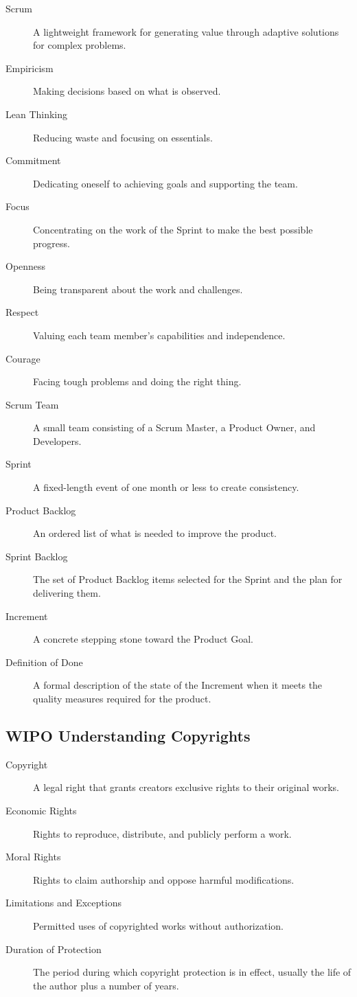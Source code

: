 \documentclass{article}
\begin{document}
\begin{description}
  \item[Scrum] A lightweight framework for generating value through adaptive solutions for complex problems.
  \item[Empiricism] Making decisions based on what is observed.
  \item[Lean Thinking] Reducing waste and focusing on essentials.
  \item[Commitment] Dedicating oneself to achieving goals and supporting the team.
  \item[Focus] Concentrating on the work of the Sprint to make the best possible progress.
  \item[Openness] Being transparent about the work and challenges.
  \item[Respect] Valuing each team member's capabilities and independence.
  \item[Courage] Facing tough problems and doing the right thing.
  \item[Scrum Team] A small team consisting of a Scrum Master, a Product Owner, and Developers.
  \item[Sprint] A fixed-length event of one month or less to create consistency.
  \item[Product Backlog] An ordered list of what is needed to improve the product.
  \item[Sprint Backlog] The set of Product Backlog items selected for the Sprint and the plan for delivering them.
  \item[Increment] A concrete stepping stone toward the Product Goal.
  \item[Definition of Done] A formal description of the state of the Increment when it meets the quality measures required for the product.
\end{description}


\subsection{WIPO Understanding Copyrights}

\begin{description}
  \item[Copyright] A legal right that grants creators exclusive rights to their original works.
  \item[Economic Rights] Rights to reproduce, distribute, and publicly perform a work.
  \item[Moral Rights] Rights to claim authorship and oppose harmful modifications.
  \item[Limitations and Exceptions] Permitted uses of copyrighted works without authorization.
  \item[Duration of Protection] The period during which copyright protection is in effect, usually the life of the author plus a number of years.
\end{description}
\end{document}
